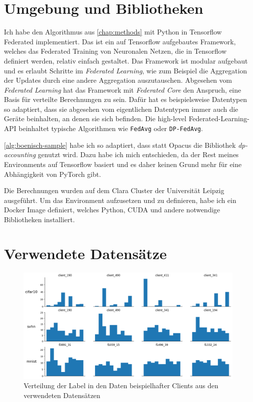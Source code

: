 \section{Umgebung und Bibliotheken}
Ich habe den Algorithmus aus \autoref{chap:methods} mit Python in Tensorflow Federated implementiert. Das ist ein auf Tensorflow aufgebautes Framework, welches das Federated Training von Neuronalen Netzen, die in Tensorflow definiert werden, relativ einfach gestaltet. Das Framework ist modular aufgebaut und es erlaubt Schritte im \textit{Federated Learning}, wie zum Beispiel die Aggregation der Updates durch eine andere Aggregation auszutauschen. Abgesehen vom \textit{Federated Learning} hat das Framework mit \textit{Federated Core} den Anspruch, eine Basis für verteilte Berechnungen zu sein. Dafür hat es beispielsweise Datentypen so adaptiert, dass sie abgesehen vom eigentlichen Datentypen immer auch die Geräte beinhalten, an denen sie sich befinden. Die high-level Federated-Learning-API beinhaltet typische Algorithmen wie \texttt{FedAvg} oder \texttt{DP-FedAvg}.

\autoref{alg:boenisch-sample} habe ich so adaptiert, dass statt Opacus die Bibliothek \textit{dp-accounting} genutzt wird. Dazu habe ich mich entschieden, da der Rest meines Environments auf Tensorflow basiert und es daher keinen Grund mehr für eine Abhängigkeit von PyTorch gibt.

Die Berechnungen wurden auf dem Clara Cluster der Universität Leipzig ausgeführt. Um das Environment aufzusetzen und zu definieren, habe ich ein Docker Image definiert, welches Python, CUDA und andere notwendige Bibliotheken installiert.

\section{Verwendete Datensätze}

\begin{figure}[tb]
	\centering
	\includegraphics[width=\textwidth]{Bilder/label_distribution.png}
	\caption{Verteilung der Label in den Daten beispielhafter Clients aus den verwendeten Datensätzen}
	\label{fig:label-distribution}
\end{figure}

